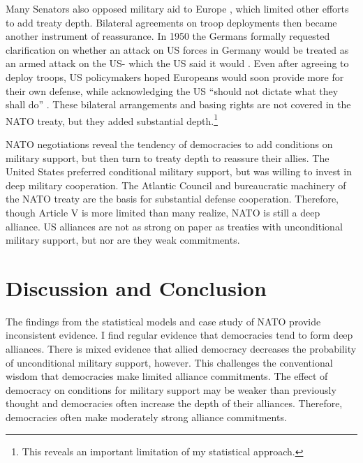 \documentclass[12pt]{article}
\begin{document}
Many Senators also opposed military aid to Europe \citep[pg 285]{Acheson1969}, which limited other efforts to add treaty depth. 
Bilateral agreements on troop deployments then became another instrument of reassurance. 
In 1950 the Germans formally requested clarification on whether an attack on US forces in Germany would be treated as an armed attack on the US- which the US said it would \citep[pg. 395]{Acheson1969}.  
Even after agreeing to deploy troops, US policymakers hoped Europeans would soon provide more for their own defense, while acknowledging the US ``should not dictate what they shall do'' \citep[pg. 2]{Johnson1950}. 
These bilateral arrangements and basing rights are not covered in the NATO treaty, but they added substantial depth.\footnote{This reveals an important limitation of my statistical approach.}  


NATO negotiations reveal the tendency of democracies to add conditions on military support, but then turn to treaty depth to reassure their allies. 
The United States preferred conditional military support, but was willing to invest in deep military cooperation. 
The Atlantic Council and bureaucratic machinery of the NATO treaty are the basis for substantial defense cooperation. 
Therefore, though Article V is more limited than many realize, NATO is still a deep alliance. 
US alliances are not as strong on paper as treaties with unconditional military support, but nor are they weak commitments. 


\section{Discussion and Conclusion}


The findings from the statistical models and case study of NATO provide inconsistent evidence. 
I find regular evidence that democracies tend to form deep alliances.
There is mixed evidence that allied democracy decreases the probability of unconditional military support, however. 
This challenges the conventional wisdom that democracies make limited alliance commitments.
The effect of democracy on conditions for military support may be weaker than previously thought and democracies often increase the depth of their alliances. 
Therefore, democracies often make moderately strong alliance commitments. 
\end{document}
